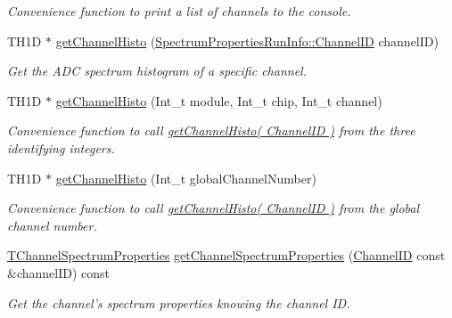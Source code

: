 \begin{DoxyCompactItemize}
\begin{DoxyCompactList}\small\item\em Convenience function to print a list of channels to the console. \item\end{DoxyCompactList}\item 
TH1D $\ast$ \hyperlink{class_spectrum_properties_run_info_a7465313bd615a37ae548fecb6d2b11df}{getChannelHisto} (\hyperlink{class_spectrum_properties_run_info_1_1_channel_i_d}{SpectrumPropertiesRunInfo::ChannelID} channelID)
\begin{DoxyCompactList}\small\item\em Get the ADC spectrum histogram of a specific channel. \item\end{DoxyCompactList}\item 
TH1D $\ast$ \hyperlink{class_spectrum_properties_run_info_a62d810cc68f737fc7504bc0efdbb1a32}{getChannelHisto} (Int\_\-t module, Int\_\-t chip, Int\_\-t channel)
\begin{DoxyCompactList}\small\item\em Convenience function to call \hyperlink{class_spectrum_properties_run_info_a7465313bd615a37ae548fecb6d2b11df}{getChannelHisto( ChannelID )} from the three identifying integers. \item\end{DoxyCompactList}\item 
TH1D $\ast$ \hyperlink{class_spectrum_properties_run_info_a3674726bcbfef46f67f6c280de88457f}{getChannelHisto} (Int\_\-t globalChannelNumber)
\begin{DoxyCompactList}\small\item\em Convenience function to call \hyperlink{class_spectrum_properties_run_info_a7465313bd615a37ae548fecb6d2b11df}{getChannelHisto( ChannelID )} from the global channel number. \item\end{DoxyCompactList}\item 
\hyperlink{class_t_channel_spectrum_properties}{TChannelSpectrumProperties} \hyperlink{class_spectrum_properties_run_info_a95e79ffad497b11ae35155f516ef7c9b}{getChannelSpectrumProperties} (\hyperlink{class_spectrum_properties_run_info_1_1_channel_i_d}{ChannelID} const \&channelID) const 
\begin{DoxyCompactList}\small\item\em Get the channel's spectrum properties knowing the channel ID. \item\end{DoxyCompactList}\item 

\end{DoxyCompactItemize}
